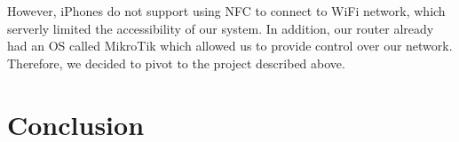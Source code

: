 \documentclass[sigconf]{acmart}
\begin{document}
However, iPhones do not support using NFC to connect to WiFi network, which serverly limited the accessibility of our system. In addition, our router already had an OS called MikroTik which allowed us to provide control over our network. Therefore, we decided to pivot to the project described above.




\section{Conclusion}


\end{document}

